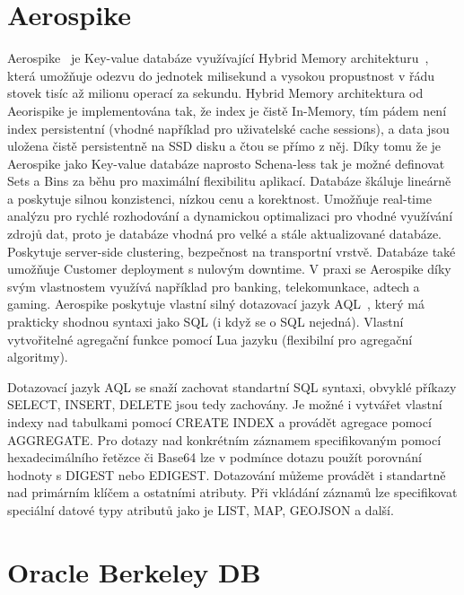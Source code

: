 \documentclass[czech,bachelor,dept460,male,csharp,cpdeclaration]{diploma}
\begin{document}
	\section{Aerospike}
	
	Aerospike~\cite{aerospike} je Key-value databáze využívající Hybrid Memory architekturu~\cite{hybmem-arch}, která umožňuje odezvu do jednotek milisekund a vysokou propustnost v řádu stovek tisíc až milionu operací za sekundu. Hybrid Memory architektura od Aeorispike je implementována tak, že index je čistě In-Memory, tím pádem není index persistentní (vhodné například pro uživatelské cache sessions), a data jsou uložena čistě persistentně na SSD disku a čtou se přímo z něj. Díky tomu že je Aerospike jako Key-value databáze naprosto Schena-less tak je možné definovat Sets a Bins za běhu pro maximální flexibilitu aplikací. Databáze škáluje lineárně a poskytuje silnou konzistenci, nízkou cenu a korektnost. Umožňuje real-time analýzu pro rychlé rozhodování a dynamickou optimalizaci pro vhodné využívání zdrojů dat, proto je databáze vhodná pro velké a stále aktualizované databáze. Poskytuje server-side clustering, bezpečnost na transportní vrstvě. Databáze také umožňuje Customer deployment s nulovým downtime. V praxi se Aerospike díky svým vlastnostem využívá například pro banking, telekomunkace, adtech a gaming. Aerospike poskytuje vlastní silný dotazovací jazyk AQL~\cite{aql}, který má prakticky shodnou syntaxi jako SQL (i když se o SQL nejedná). Vlastní vytvořitelné agregační funkce pomocí Lua jazyku (flexibilní pro agregační algoritmy).
	
	Dotazovací jazyk AQL se snaží zachovat standartní SQL syntaxi, obvyklé příkazy SELECT, INSERT, DELETE jsou tedy zachovány. Je možné i vytvářet vlastní indexy nad tabulkami pomocí CREATE INDEX a provádět agregace pomocí AGGREGATE. Pro dotazy nad konkrétním záznamem specifikovaným pomocí hexadecimálního řetězce či Base64 lze v podmínce dotazu použít porovnání hodnoty s DIGEST nebo EDIGEST. Dotazování můžeme provádět i standartně nad primárním klíčem a ostatními atributy. Při vkládání záznamů lze specifikovat speciální datové typy atributů jako je LIST, MAP, GEOJSON a další.
	
	\section{Oracle Berkeley DB}
	
\end{document}
